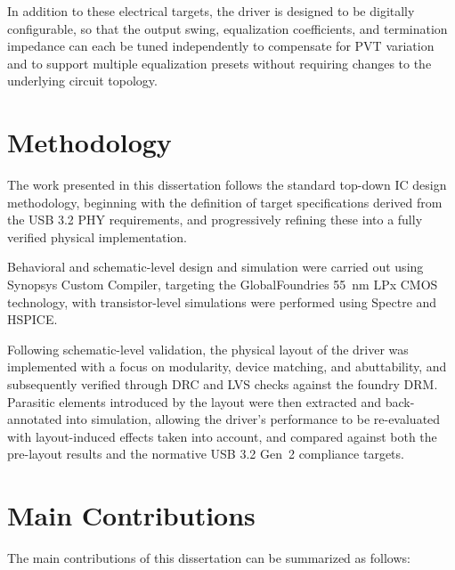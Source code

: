 
In addition to these electrical targets, the driver is designed to be digitally configurable, so that the output swing, equalization coefficients, and termination impedance can each be tuned independently to compensate for \ac{PVT} variation and to support multiple equalization presets without requiring changes to the underlying circuit topology.

\section{Methodology}

The work presented in this dissertation follows the standard top-down \ac{IC} design methodology, beginning with the definition of target specifications derived from the \ac{USB} 3.2 \ac{PHY} requirements, and progressively refining these into a fully verified physical implementation.

Behavioral and schematic-level design and simulation were carried out using Synopsys Custom Compiler, targeting the GlobalFoundries \SI{55}{\nano\meter} LPx \ac{CMOS} technology, with transistor-level simulations were performed using Spectre and HSPICE.

Following schematic-level validation, the physical layout of the driver was implemented with a focus on modularity, device matching, and abuttability, and subsequently verified through \ac{DRC} and \ac{LVS} checks against the foundry \ac{DRM}. Parasitic elements introduced by the layout were then extracted and back-annotated into simulation, allowing the driver's performance to be re-evaluated with layout-induced effects taken into account, and compared against both the pre-layout results and the normative \ac{USB} 3.2 Gen~2 compliance targets.

\section{Main Contributions}

The main contributions of this dissertation can be summarized as follows:

